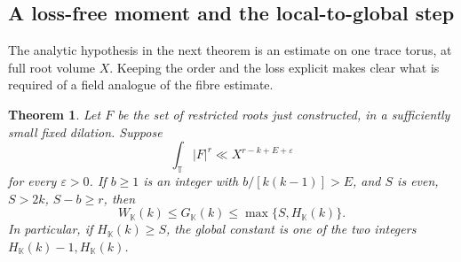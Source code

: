 \documentclass[11pt,letterpaper]{article}
\newtheorem{theorem}{Theorem}[section]
\theoremstyle{definition}
\numberwithin{equation}{section}
\begin{document}
\subsection{A loss-free moment and the local-to-global step}
The analytic hypothesis in the next theorem is an estimate on one
trace torus, at full root volume $X$. Keeping the order and the loss
explicit makes clear what is required of a field analogue of the
fibre estimate.
\begin{theorem}\label{thm:nf-absorb-transfer}
Let $F$ be the set of restricted roots just constructed, in a
sufficiently small fixed dilation. Suppose
\[
 \int_{\mathbb T}|F|^r\ll X^{r-k+E+\varepsilon}
\]
for every $\varepsilon>0$. If $b\ge1$ is an integer with
$b/[k(k-1)]>E$, and $S$ is even, $S>2k$, $S-b\ge r$,
then
\[
  W_{\mathbb K}(k)\le G_{\mathbb K}(k)
       \le \max\{S,H_{\mathbb K}(k)\}.
\]
In particular, if $H_{\mathbb K}(k)\ge S$, the global constant is
one of the two integers $H_{\mathbb K}(k)-1,H_{\mathbb K}(k)$.
\end{theorem}
\end{document}
